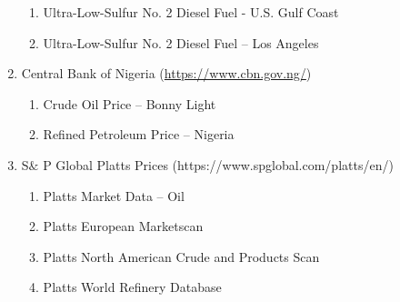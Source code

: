 \documentclass[12pt,twoside]{article}
\begin{document}
\begin{enumerate}
\begin{enumerate}
	\item Ultra-Low-Sulfur No. 2 Diesel Fuel - U.S. Gulf Coast\par

	\item Ultra-Low-Sulfur No. 2 Diesel Fuel – Los Angeles\par


\vspace{\baselineskip}

\end{enumerate}
	\item Central Bank of Nigeria (\href{https://www.cbn.gov.ng/}{https://www.cbn.gov.ng/})\par

\begin{enumerate}
	\item Crude Oil Price – Bonny Light\par

	\item Refined Petroleum Price – Nigeria\par


\vspace{\baselineskip}

\end{enumerate}
	\item S$\&$ P Global Platts Prices (https://www.spglobal.com/platts/en/)\par

\begin{enumerate}
	\item Platts Market Data – Oil\par

	\item Platts European Marketscan\par

	\item Platts North American Crude and Products Scan\par

	\item Platts World Refinery Database
\end{enumerate}
\end{enumerate}\par

{\fontsize{11pt}{13.2pt}\selectfont \par}
\par
\end{document}
